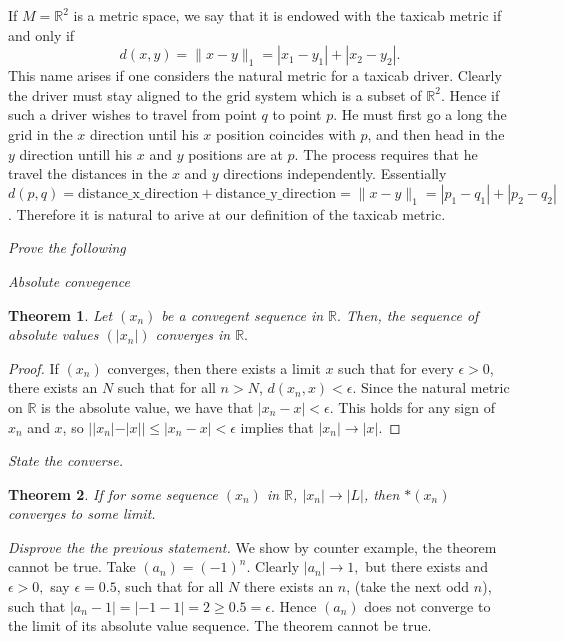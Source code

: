 \documentclass[letter]{article}
\newtheorem{theorem}{Theorem}
\newenvironment{menumerate}{%
  \edef\backupindent{\the\parindent}%
  \enumerate%
  \setlength{\parindent}{\backupindent}%
}{\endenumerate}
\begin{document}
\begin{menumerate}
	 \item If $M = \mathbb{R}^2$ is a metric space, we say that it is endowed with the taxicab metric if and only if $$d(x,y)=\|x-y\|_1=|x_1 - y_1| + |x_2 - y_2|.$$ This name arises if one considers the natural metric for a taxicab driver. Clearly the driver must stay aligned to the grid system which is a subset of $\mathbb{R}^2$. Hence if such a driver wishes to travel from point $q$ to point $p$. He must first go a long the grid in the $x$ direction until his $x$ position coincides with $p$, and then head in the $y$ direction untill his $x$ and $y$ positions are at $p$. The process requires that he travel the distances in the $x$ and $y$ directions independently. Essentially $d(p,q) = \mathrm{distance\_x\_direction} + \mathrm{distance\_y\_direction} =\|x-y\|_1=|p_1 - q_1| + |p_2 - q_2|$. Therefore it is natural to arive at our definition of the taxicab metric.

	 \setcounter{enumi}{7}
	 \item \textit{Prove the following}
	 	\begin{menumerate}
	 	 	\item \textit{Absolute convegence}
	 	 		\begin{theorem}
	 	 		 	Let $(x_n)$ be a convegent sequence in $\mathbb{R}.$ Then, the sequence of absolute values $(|x_n|)$ converges in $\mathbb{R}.$
	 	 		 \end{theorem} 
	 	 		 \begin{proof}
	 	 		 	If $(x_n)$ converges, then there exists a limit $x$ such that for every $\epsilon > 0$, there exists an $N$ such that for all $n > N$, $d(x_n,x) < \epsilon$. Since the natural metric on $\mathbb{R}$ is the absolute value, we have that $|x_n - x| < \epsilon.$ This holds for any sign of $x_n$ and $x$, so $||x_n| - |x||\leq |x_n - x| < \epsilon$ implies that $|x_n| \to |x|.$
	 	 		 \end{proof}
 	 		 \item \textit{State the converse.}
 	 		 	\begin{theorem}
 	 		 	 	If for some sequence $(x_n)$ in $\mathbb{R}$, $|x_n| \to |L|$, then $*(x_n)$ converges to some limit.
 	 		 	 \end{theorem} 
	 		 \item \textit{Disprove the the previous statement. } We show by counter example, the theorem cannot be true. Take $(a_n) = (-1)^n$. Clearly $|a_n| \to 1,$ but there exists and $\epsilon >0, $ say $\epsilon = 0.5$, such that for all $N$ there exists an $n$, (take the next odd $n$), such that $|a_n - 1| = |-1 - 1| = 2 \geq 0.5 = \epsilon.$ Hence $(a_n)$ does not converge to the limit of its absolute value sequence. The theorem cannot be true. 
	 	 \end{menumerate} 


\end{menumerate}
\end{document}
